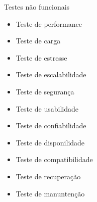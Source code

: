 \begin{frame}{Testes não funcionais}
    \begin{itemize}
        \item Teste de performance
        \item Teste de carga
        \item Teste de estresse
        \item Teste de escalabilidade
        \item Teste de segurança
        \item Teste de usabilidade
        \item Teste de confiabilidade
        \item Teste de disponilidade
        \item Teste de compatibilidade
        \item Teste de recuperação
        \item Teste de manuntenção
    \end{itemize}
\end{frame}
